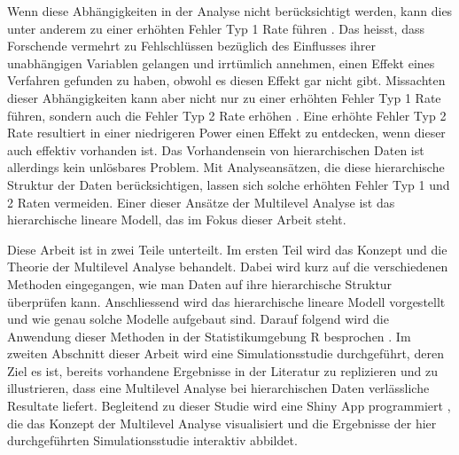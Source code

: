 \documentclass[12pt]{article}\usepackage[]{graphicx}\usepackage[]{color}
\begin{document}
Wenn diese Abhängigkeiten in der Analyse nicht berücksichtigt werden, kann dies unter anderem zu einer erhöhten Fehler Typ 1 Rate führen \citep{dorman2008effect, mcneish2014analyzing}. Das heisst, dass Forschende vermehrt zu Fehlschlüssen bezüglich des Einflusses ihrer unabhängigen Variablen gelangen und irrtümlich annehmen, einen Effekt eines Verfahren gefunden zu haben, obwohl es diesen Effekt gar nicht gibt. Missachten dieser Abhängigkeiten kann aber nicht nur zu einer erhöhten Fehler Typ 1 Rate führen, sondern auch die Fehler Typ 2 Rate erhöhen \citep{MOERBEEK2003341}. Eine erhöhte Fehler Typ 2 Rate resultiert in einer niedrigeren Power einen Effekt zu entdecken, wenn dieser auch effektiv vorhanden ist. Das Vorhandensein von hierarchischen Daten ist allerdings kein unlösbares Problem. Mit Analyseansätzen, die diese hierarchische Struktur der Daten berücksichtigen, lassen sich solche erhöhten Fehler Typ 1 und 2 Raten vermeiden. Einer dieser Ansätze der Multilevel Analyse ist das hierarchische lineare Modell, das im Fokus dieser Arbeit steht.

Diese Arbeit ist in zwei Teile unterteilt. Im ersten Teil wird das Konzept und die Theorie der Multilevel Analyse behandelt. Dabei wird kurz auf die verschiedenen Methoden eingegangen, wie man Daten auf ihre hierarchische Struktur überprüfen kann. Anschliessend wird das hierarchische lineare Modell vorgestellt und wie genau solche Modelle aufgebaut sind. Darauf folgend wird die Anwendung dieser Methoden in der Statistikumgebung R besprochen \citep{R}. Im zweiten Abschnitt dieser Arbeit wird eine Simulationsstudie durchgeführt, deren Ziel es ist, bereits vorhandene Ergebnisse in der Literatur zu replizieren und zu illustrieren, dass eine Multilevel Analyse bei hierarchischen Daten verlässliche Resultate liefert. Begleitend zu dieser Studie wird eine Shiny App programmiert \citep{shiny}, die das Konzept der Multilevel Analyse visualisiert und die Ergebnisse der hier durchgeführten Simulationsstudie interaktiv abbildet.
\end{document}

